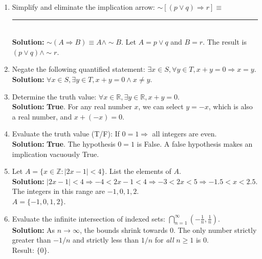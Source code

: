 \documentclass[11pt]{article}
\begin{document}
\begin{enumerate}[label=(\roman*)]
    \item Simplify and eliminate the implication arrow: $\sim[(p \vee q) \Rightarrow r] \equiv$ \rule{3cm}{0.15mm}\\
    \textbf{Solution:} $\sim(A \Rightarrow B) \equiv A \wedge \sim B$. Let $A = p \vee q$ and $B = r$. The result is $(p \vee q) \wedge \sim r$.

    \item Negate the following quantified statement: $\exists x \in S, \forall y \in T, x+y = 0 \Rightarrow x = y$.\\
    \textbf{Solution:} $\forall x \in S, \exists y \in T, x+y = 0 \wedge x \neq y$.

    \item Determine the truth value: $\forall x \in \mathbb{R}, \exists y \in \mathbb{R}, x+y = 0$.\\
    \textbf{Solution:} \textbf{True}. For any real number $x$, we can select $y = -x$, which is also a real number, and $x + (-x) = 0$.

    \item Evaluate the truth value (T/F): If $0 = 1 \Rightarrow$ all integers are even.\\
    \textbf{Solution:} \textbf{True}. The hypothesis $0=1$ is False. A false hypothesis makes an implication vacuously True.

    \item Let $A = \{x \in \mathbb{Z} : |2x - 1| < 4\}$. List the elements of $A$.\\
    \textbf{Solution:} $|2x - 1| < 4 \Rightarrow -4 < 2x - 1 < 4 \Rightarrow -3 < 2x < 5 \Rightarrow -1.5 < x < 2.5$. The integers in this range are $-1, 0, 1, 2$. \\
    $A = \{-1, 0, 1, 2\}$.

    \item Evaluate the infinite intersection of indexed sets: $\bigcap_{n=1}^\infty \left(-\frac{1}{n}, \frac{1}{n}\right)$.\\
    \textbf{Solution:} As $n \to \infty$, the bounds shrink towards 0. The only number strictly greater than $-1/n$ and strictly less than $1/n$ for \textit{all} $n \geq 1$ is 0. \\
    Result: $\{0\}$.
\end{enumerate}
\end{document}
